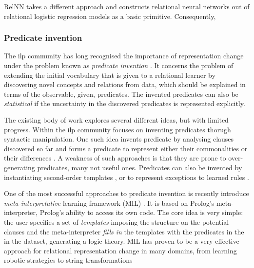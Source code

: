 RelNN takes a different approach and constructs relational neural networks out of relational logistic regression models as a basic primitive.
Consequently, 






\subsubsection{Predicate invention}

The \gls{ilp} community has long recognised the importance of representation change under the problem known as \textit{predicate invention} \cite{Kramer1995}.
It concerns the problem of extending the initial vocabulary that is given to a relational learner by discovering novel concepts and relations from data, which should be explained in terms of the observable, given, predicates.
The invented predicates can also be \textit{statistical} if the uncertainty in the discovered predicates is represented explicitly.


The existing body of work explores several different ideas, but with limited progress.
Within the \gls{ilp} community focuses on inventing predicates thorugh syntactic manipulation.
One such idea invents predicate by analysing clauses discovered so far and forms a predicate to represent either their commonalities \cite{Wogulis1989} or their differences \cite{MuggletonBu88}.
A weakness of such approaches is that they are prone to over-generating predicates, many not useful ones.
Predicates can also be invented by instantiating second-order templates \cite{Silverstein91}, or to represent exceptions to learned rules \cite{Srinivasan92}.

One of the most successful approaches to predicate invention is recently introduce \textit{meta-interpretative} learning framework (MIL) \cite{MuggletonMIL,Cropper2018,Cropper:2015}.
It is based on Prolog's meta-interpreter, Prolog's ability to access its own code.
The core idea is very simple: the user specifies a set of \textit{templates} imposing the structure on the potential clauses and the meta-interpreter \textit{fills in} the templates with the predicates in the in the dataset, generating a logic theory.
MIL has proven to be a very effective approach for relational representation change in many domains, from learning robotic strategies to string transformations \cite{Cropper2015LearningEL,DBLP:journals/ml/MuggletonDSTWZ18,DBLP:conf/ilp/CropperTM15} 



